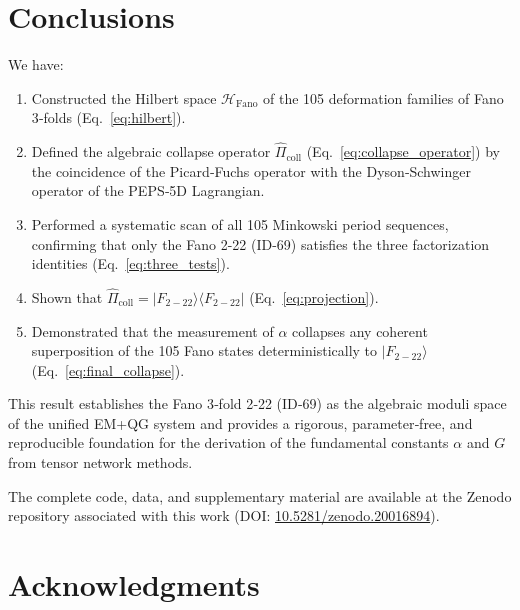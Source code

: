 \documentclass[12pt]{article}
\begin{document}
\section{Conclusions}

We have:

\begin{enumerate}
  \item Constructed the Hilbert space \(\mathcal{H}_{\text{Fano}}\) of the 105
        deformation families of Fano 3‑folds (Eq.~\ref{eq:hilbert}).
  \item Defined the algebraic collapse operator \(\hat{\Pi}_{\text{coll}}\)
        (Eq.~\ref{eq:collapse_operator}) by the coincidence of the Picard‑Fuchs
        operator with the Dyson‑Schwinger operator of the PEPS‑5D Lagrangian.
  \item Performed a systematic scan of all 105 Minkowski period sequences,
        confirming that only the Fano 2-22 (ID-69) satisfies the three
        factorization identities (Eq.~\ref{eq:three_tests}).
  \item Shown that \(\hat{\Pi}_{\text{coll}} = |F_{2-22}\rangle\langle F_{2-22}|\)
        (Eq.~\ref{eq:projection}).
  \item Demonstrated that the measurement of \(\alpha\) collapses any coherent
        superposition of the 105 Fano states deterministically to
        \(|F_{2-22}\rangle\) (Eq.~\ref{eq:final_collapse}).
\end{enumerate}

This result establishes the Fano 3‑fold 2‑22 (ID‑69) as the algebraic
moduli space of the unified EM+QG system and provides a rigorous, parameter‑free,
and reproducible foundation for the derivation of the fundamental constants
\(\alpha\) and \(G\) from tensor network methods.

The complete code, data, and supplementary material are available at the
Zenodo repository associated with this work
(DOI: \href{https://doi.org/10.5281/zenodo.20016894}{10.5281/zenodo.20016894}).

\section*{Acknowledgments}
\end{document}
